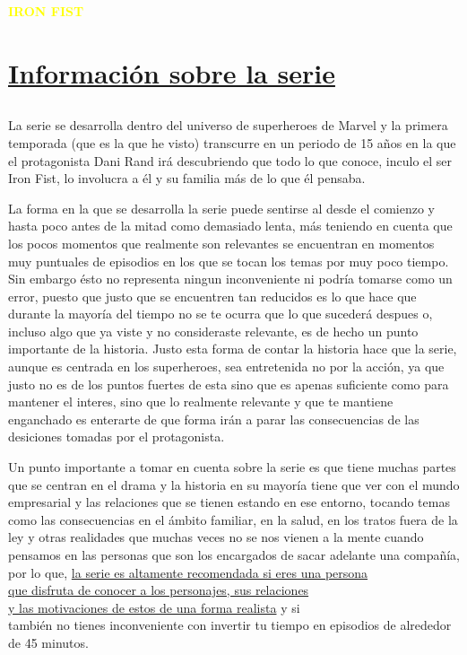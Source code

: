 \documentclass[a5paper, 11pt]{article}
\begin{document}
\begin{center}
\textcolor{yellow}{\textbf{\Huge{IRON FIST}}}    
\end{center}


\pagecolor{jordan}

\color{white}


\section*{\underline{Información sobre la serie}}

\subsection*{\color{orange}{Camino del Iron Fist}}

La serie se desarrolla dentro del universo de superheroes de Marvel y la primera temporada (que es la que he visto) transcurre en un periodo de 15 años en la que el protagonista Dani Rand irá descubriendo que todo lo que conoce, inculo el ser Iron Fist, lo involucra a él y su familia más de lo que él pensaba.

La forma en la que se desarrolla la serie puede sentirse al desde el comienzo y hasta poco antes de la mitad como demasiado lenta, más teniendo en cuenta que los pocos momentos que realmente son relevantes se encuentran en momentos muy puntuales de episodios en los que se tocan los temas por muy poco tiempo. 
Sin embargo ésto no representa ningun inconveniente ni podría tomarse como un error, puesto que justo que se encuentren tan reducidos es lo que hace que durante la mayoría del tiempo no se te ocurra que lo que sucederá despues o, incluso algo que ya viste y no consideraste relevante, es de hecho un punto importante de la historia. 
Justo esta forma de contar la historia hace que la serie, aunque es centrada en los superheroes, sea entretenida no por la acción, ya que justo no es de los puntos fuertes de esta sino que es apenas suficiente como para mantener el interes, sino que lo realmente relevante y que te mantiene enganchado es enterarte de que forma irán a parar las consecuencias de las desiciones tomadas por el protagonista.

Un punto importante a tomar en cuenta sobre la serie es que tiene muchas partes que se centran en el drama y la historia en su mayoría tiene que ver con el mundo empresarial y las relaciones que se tienen estando en ese entorno, tocando temas como las consecuencias en el ámbito familiar, en la salud, en los tratos fuera de la ley y otras realidades que muchas veces no se nos vienen a la mente cuando pensamos en las personas que son los encargados de sacar adelante una compañía, por lo que, \underline{la serie es altamente recomendada si eres una persona}
\\ \underline{que disfruta de conocer a los personajes, sus relaciones}
\\ \underline{y las motivaciones de estos de una forma realista} y si \\ también no tienes inconveniente con invertir tu tiempo en episodios de alrededor de 45 minutos.
\end{document}

